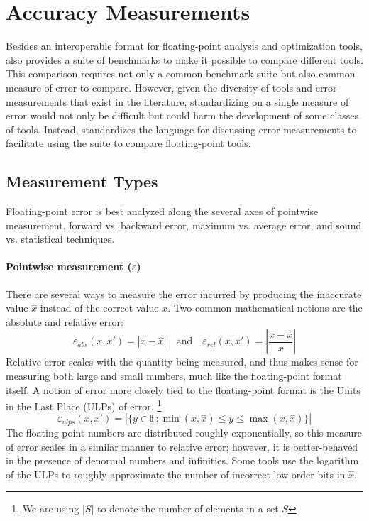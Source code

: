 \documentclass[main.tex]{subfiles}
\begin{document}
\section{Accuracy Measurements}
\label{sec:measure}

Besides an interoperable format
  for floating-point analysis and optimization tools,
  \name also provides a suite of benchmarks
  to make it possible to compare different tools.
This comparison requires not only a common benchmark suite
  but also common measure of error to compare.
However, given the diversity of tools and error measurements
  that exist in the literature,
  standardizing on a single measure of error
  would not only be difficult but could harm the development
  of some classes of tools.
Instead, \name standardizes the language
  for discussing error measurements
  to facilitate using the \name suite to compare floating-point tools.

\subsection{Measurement Types}

Floating-point error is best analyzed along the several axes
  of pointwise measurement, forward vs. backward error,
  maximum vs. average error, and sound vs. statistical techniques.

\paragraph{Pointwise measurement ($\varepsilon$)}

There are several ways to measure the error incurred
  by producing the inaccurate value $\hat x$ instead of the correct value $x$.
Two common mathematical notions are the absolute and relative error:
\begin{equation*}
  \varepsilon_{abs}(x, x') = \left|x - \hat x\right|
  \quad \text{and} \quad
  \varepsilon_{rel}(x, x') = \left|\frac{x - \hat x}{x}\right|
\end{equation*}
Relative error scales with the quantity being measured,
  and thus makes sense for measuring both large and small numbers,
  much like the floating-point format itself.
A notion of error more closely tied to the floating-point format
  is the Units in the Last Place (ULPs) of error.%
\footnote{We are using $|S|$ to denote the number of elements in a set $S$}
\[
\varepsilon_{ulps}(x, x') = |\{ y \in \mathbb{F} : \min(x, \hat x) \le y \le \max(x, \hat x)
\}|
\]
The floating-point numbers are distributed roughly exponentially, so
this measure of error scales in a similar manner to relative
error; however, it is better-behaved in the presence of denormal
numbers and infinities.
Some tools use the logarithm of the ULPs to roughly approximate
the number of incorrect low-order bits in $\hat x$.
\end{document}
